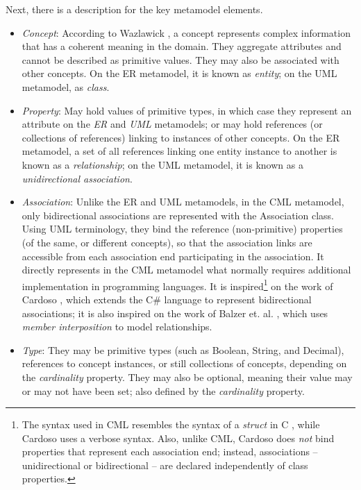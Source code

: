 Next, there is a description for the key metamodel elements.

\begin{itemize}

\item \emph{Concept}: According to Wazlawick \cite{wazlawick},
a concept represents complex information that has a coherent meaning in the domain.
They aggregate attributes and cannot be described as primitive values.
They may also be associated with other concepts.
On the ER metamodel, it is known as \emph{entity};
on the UML metamodel, as \emph{class}.

\item \emph{Property}: May hold values of primitive types, in which case they represent an attribute on the \emph{ER} and \emph{UML} metamodels;
or may hold references (or collections of references) linking to instances of other concepts.
On the ER metamodel,
a set of all references linking one entity instance to another is known as a \emph{relationship};
on the UML metamodel, it is known as a \emph{unidirectional association}.

\item \emph{Association}: Unlike the ER and UML metamodels, in the CML metamodel, only bidirectional associations are represented with the Association class. Using UML terminology, they bind the reference (non-primitive) properties (of the same, or different concepts),
so that the association links are accessible from each association end participating in the association.
It directly represents in the CML metamodel what normally requires additional implementation in programming languages.
It is inspired\footnote{The syntax used in CML resembles the syntax of a \emph{struct} in C \cite{clang}, while Cardoso \cite{cardoso} uses a verbose syntax. Also, unlike CML, Cardoso does \emph{not} bind properties that represent each association end; instead, associations -- unidirectional or bidirectional -- are declared independently of class properties.} on the work of Cardoso \cite{cardoso}, which extends the C\# language to represent bidirectional associations; it is also inspired on the work of Balzer et. al. \cite{balzer}, which uses \emph{member interposition} to model relationships.

\item \emph{Type}: They may be primitive types (such as Boolean, String, and Decimal), references to concept instances, or still collections of concepts, depending on the \emph{cardinality} property. They may also be optional, meaning their value may or may not have been set; also defined by the \emph{cardinality} property.

\end{itemize}
